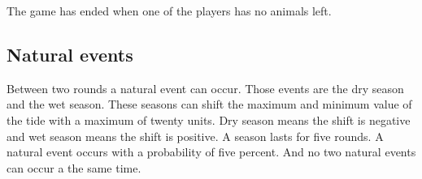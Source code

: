 \documentclass[12pt]{article}
\begin{document}
The game has ended when one of the players has no animals left.

\subsection{Natural events}
Between two rounds a natural event can occur. Those events are the dry season and the wet season. These seasons can shift the maximum and minimum value of the tide with a maximum of twenty units. Dry season means the shift is negative and wet season means the shift is positive. A season lasts for five rounds. A natural event occurs with a probability of five percent. And no two natural events can occur a the same time.
\end{document}
